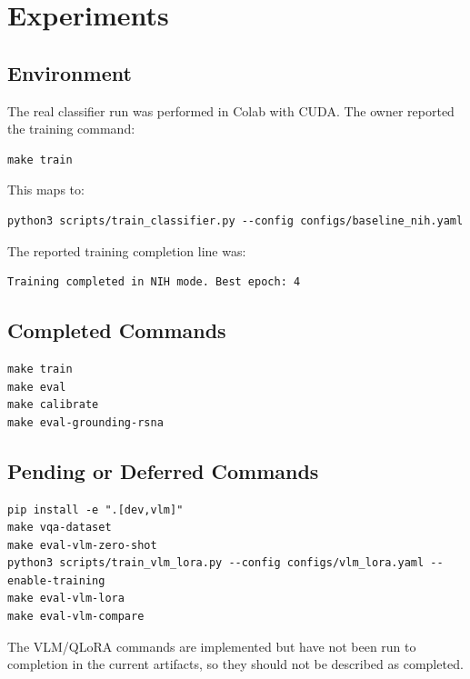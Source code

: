 \section{Experiments}

\subsection{Environment}

The real classifier run was performed in Colab with CUDA. The owner reported the training command:

\begin{verbatim}
make train
\end{verbatim}

This maps to:

\begin{verbatim}
python3 scripts/train_classifier.py --config configs/baseline_nih.yaml
\end{verbatim}

The reported training completion line was:

\begin{verbatim}
Training completed in NIH mode. Best epoch: 4
\end{verbatim}

\subsection{Completed Commands}

\begin{verbatim}
make train
make eval
make calibrate
make eval-grounding-rsna
\end{verbatim}

\subsection{Pending or Deferred Commands}

\begin{verbatim}
pip install -e ".[dev,vlm]"
make vqa-dataset
make eval-vlm-zero-shot
python3 scripts/train_vlm_lora.py --config configs/vlm_lora.yaml --enable-training
make eval-vlm-lora
make eval-vlm-compare
\end{verbatim}

The VLM/QLoRA commands are implemented but have not been run to completion in the current artifacts, so they should not be described as completed.
